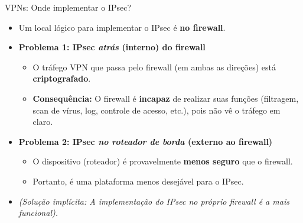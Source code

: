 \begin{frame}{VPNs: Onde implementar o IPsec?}
    \begin{itemize}
        \item Um local lógico para implementar o IPsec é \textbf{no firewall}.

        \item \textbf{Problema 1: IPsec \textit{atrás} (interno) do firewall}
              \begin{itemize}
                  \item O tráfego VPN que passa pelo firewall (em ambas as direções) está \textbf{criptografado}.
                  \item \textbf{Consequência:} O firewall é \textbf{incapaz} de realizar suas funções (filtragem, scan de vírus, log, controle de acesso, etc.), pois não vê o tráfego em claro.
              \end{itemize}

        \item \textbf{Problema 2: IPsec \textit{no roteador de borda} (externo ao firewall)}
              \begin{itemize}
                  \item O dispositivo (roteador) é provavelmente \textbf{menos seguro} que o firewall.
                  \item Portanto, é uma plataforma menos desejável para o IPsec.
              \end{itemize}

        \item \textit{(Solução implícita: A implementação do IPsec no próprio firewall é a mais funcional).}
    \end{itemize}
\end{frame}

